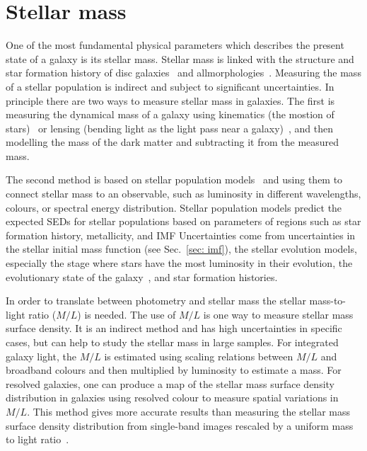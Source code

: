 
\section{Stellar mass}
\label{sec: starmass_intro}
One of the most fundamental physical parameters which describes the present state of a galaxy is its stellar mass. 
Stellar mass is linked with the structure and star formation history of disc galaxies~\citep{Gavvazi96} and allmorphologies~\citep{Scodeggio02}. 
Measuring the mass of a stellar population is indirect and subject to significant uncertainties. 
In principle there are two ways to measure stellar mass in galaxies. 
The first is measuring the dynamical mass of a galaxy using kinematics (the mostion of stars)~\citep{Cappellari06} or lensing (bending light as the light pass near a galaxy)~\citep{Auger09}, and then modelling the mass of the dark matter and subtracting it from the measured mass. 

The second method is based on stellar population models~\citep[e.g.][]{ Bruzual93, Kotulla09} and using them to connect stellar mass to an observable, such as luminosity in different wavelengths, colours, or spectral energy distribution. 
Stellar population models predict the expected SEDs for stellar populations based on parameters of regions such as star formation history, metallicity, and IMF
Uncertainties come from uncertainties in the stellar initial mass function (see Sec.~\ref{sec: imf}), the stellar evolution models, especially the stage where stars have the most luminosity in their evolution, the evolutionary state of the galaxy~\citep[see,][ans references therein]{Dalcanton12}, and star formation histories. 


In order to translate between photometry and stellar mass the stellar mass-to-light ratio ($M/L$) is needed.
The use of $M/L$ is one way to measure stellar mass surface density. It is an indirect method and has high uncertainties in specific cases, but can help to study the stellar mass in large samples. 
For integrated galaxy light, the $M/L$ is estimated using scaling relations between $M/L$ and broadband colours \citep[e.g.]{Bell03} and then multiplied by luminosity to estimate a mass.
For resolved galaxies, one can produce a map of the stellar mass surface density distribution in galaxies using resolved colour to measure spatial variations in $M/L$.
This method gives more accurate results than measuring the stellar mass surface density distribution from single-band images rescaled by a uniform mass to light ratio~\citep{Zibetti09}.
 

